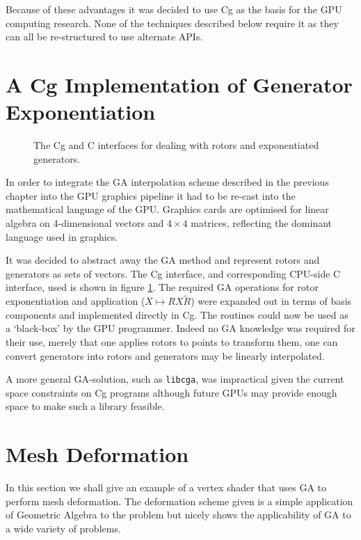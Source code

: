 Because of these advantages it was decided to use Cg as the basis for the GPU
computing research. None of the techniques described below require it as they
can all be re-structured to use alternate APIs.

\section{A Cg Implementation of Generator Exponentiation}

\begin{figure}[p]
\centering
{}
\caption{\label{fig:rotortools}The Cg and C interfaces for dealing with rotors and
  exponentiated generators.}
\end{figure}

In order to integrate the GA interpolation scheme described in the previous 
chapter into the GPU graphics pipeline it had to be re-cast into the 
mathematical language of the GPU. Graphics cards are optimised for 
linear algebra on 4-dimensional vectors and $4\times4$ matrices, reflecting
the dominant language used in graphics. 

It was decided to abstract away the GA method and represent rotors and
generators as sets of vectors. The Cg interface, and corresponding CPU-side C
interface, used is shown in figure \ref{fig:rotortools}. The required GA
operations for rotor exponentiation and application ($X \mapsto RX\tilde{R}$)
were expanded out in terms of basis components and implemented
directly in Cg. The routines could now be used as a `black-box' by the GPU 
programmer. Indeed no GA knowledge was required for their use, merely that one
applies rotors to points to transform them, one can convert generators into
rotors and generators may be linearly interpolated.

A more general GA-solution, such as {\tt libcga}, was impractical given the
current space constraints on Cg programs although future GPUs may provide
enough space to make such a library feasible.

\section{Mesh Deformation}

In this section we shall give an example of a vertex shader that uses GA to
perform mesh deformation. The deformation scheme given is a simple application
of Geometric Algebra to the problem but nicely shows the applicability of GA to a
wide variety of problems.

